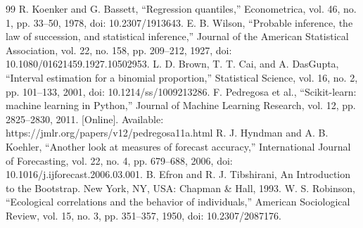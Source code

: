 \documentclass[conference]{IEEEtran}
\begin{document}
\begin{thebibliography}{99}
 R. Koenker and G. Bassett, “Regression quantiles,” Econometrica, vol. 46, no. 1, pp. 33–50, 1978, doi: 10.2307/1913643.
 E. B. Wilson, “Probable inference, the law of succession, and statistical inference,” Journal of the American Statistical Association, vol. 22, no. 158, pp. 209–212, 1927, doi: 10.1080/01621459.1927.10502953.
 L. D. Brown, T. T. Cai, and A. DasGupta, “Interval estimation for a binomial proportion,” Statistical Science, vol. 16, no. 2, pp. 101–133, 2001, doi: 10.1214/ss/1009213286.
 F. Pedregosa et al., “Scikit-learn: machine learning in Python,” Journal of Machine Learning Research, vol. 12, pp. 2825–2830, 2011. [Online]. Available: https://jmlr.org/papers/v12/pedregosa11a.html
 R. J. Hyndman and A. B. Koehler, “Another look at measures of forecast accuracy,” International Journal of Forecasting, vol. 22, no. 4, pp. 679–688, 2006, doi: 10.1016/j.ijforecast.2006.03.001.
 B. Efron and R. J. Tibshirani, An Introduction to the Bootstrap. New York, NY, USA: Chapman \& Hall, 1993.
 W. S. Robinson, “Ecological correlations and the behavior of individuals,” American Sociological Review, vol. 15, no. 3, pp. 351–357, 1950, doi: 10.2307/2087176.
\end{thebibliography}
\end{document}
